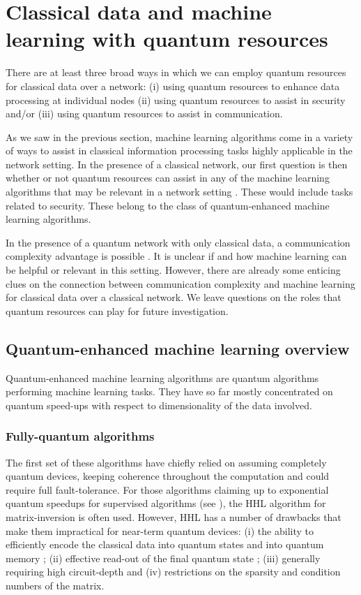 \documentclass[twocolumn, aps, rmp, amsmath, amssymb, nofootinbib, superscriptaddress, longbibliography, floatfix, table-of-contents, eqsecnum]{revtex4-2}
\begin{document}
\section{Classical data and machine learning with quantum resources}
There are at least three broad ways in which we can employ quantum resources for classical data over a network: (i) using quantum resources to enhance data processing at individual nodes (ii) using quantum resources to assist in security and/or (iii) using quantum resources to assist in communication.

As we saw in the previous section, machine learning algorithms come in a variety of ways to assist in classical information processing tasks highly applicable in the network setting. In the presence of a classical network, our first question is then whether or not quantum resources can assist in any of the machine learning algorithms that may be relevant in a network setting . These would include tasks related to security. These belong to the class of quantum-enhanced machine learning algorithms.

In the presence of a quantum network with only classical data, a communication complexity advantage is possible \cite{brassard2003quantum}. It is unclear if and how machine learning can be helpful or relevant in this setting. However, there are already some enticing clues \cite{kane2017communication, balcan2012distributed, conitzer2004communication} on the connection between communication complexity and machine learning for classical data over a classical network. We leave questions on the roles that quantum resources can play for future investigation. 

\subsection{Quantum-enhanced machine learning overview}
Quantum-enhanced machine learning algorithms are quantum algorithms performing machine learning tasks. They have so far mostly concentrated on quantum speed-ups with respect to dimensionality of the data involved. \\

\subsubsection{Fully-quantum algorithms}

The first set of these algorithms have chiefly relied on assuming completely quantum devices, keeping coherence throughout the computation and could require full fault-tolerance. For those algorithms claiming up to exponential quantum speedups for supervised algorithms (see \cite{biamonte2017quantum, ciliberto2018quantum}),  the HHL algorithm \cite{harrow2009quantum} for matrix-inversion is often used. However, HHL has a number of drawbacks that make them impractical for near-term quantum devices: (i) the ability to efficiently encode the classical data into quantum states and into quantum memory \cite{aaronson2015read}; (ii) effective read-out of the final quantum state \cite{aaronson2015read}; (iii) generally requiring high circuit-depth and (iv) restrictions on the sparsity and condition numbers of the matrix.
\end{document}
